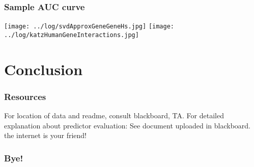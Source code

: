 \documentclass{beamer}
\begin{document}
\begin{frame}
\frametitle{Sample AUC curve}
\texttt{[image: ../log/svdApproxGeneGeneHs.jpg]}
\texttt{[image: ../log/katzHumanGeneInteractions.jpg]}
\end{frame}


\section{Conclusion}
\begin{frame}
\frametitle{Resources}
\pause For location of data and readme, consult blackboard, TA.
\pause For detailed explanation about predictor evaluation: See document uploaded in blackboard.
\pause the internet is your friend!
\end{frame}

\begin{frame}
\frametitle{Bye!}
\end{frame}

% 
% 
\end{document}
